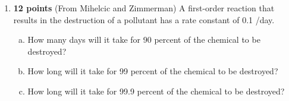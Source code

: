 \documentclass[12pt,letterpaper]{article}
\begin{document}
\begin{enumerate}
\item \textbf{12 points}  (From Mihelcic and Zimmerman)
A first-order reaction that results in the destruction of a pollutant has a rate constant of 0.1 /day.
\begin{enumerate}[a)]
\item How many days will it take for 90 percent of the chemical to be destroyed?
\item How long will it take for 99 percent of the chemical to be destroyed?
\item How long will it take for 99.9 percent of the chemical to be destroyed?

 \end{enumerate}








\end{enumerate}
\end{document}
